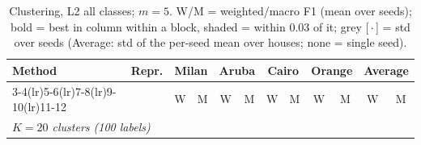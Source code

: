 \begin{table}[H]
\centering\small
\caption{Clustering, L2 all classes; $m=5$. W/M = weighted/macro F1 (mean over seeds); bold = best in column within a block, shaded = within 0.03 of it; grey [\,$\cdot$\,] = std over seeds (Average: std of the per-seed mean over houses; none = single seed).}
\label{tab:clu_l2_all_m5}
\setlength{\tabcolsep}{3.2pt}
\begin{tabular}{llcc|cc|cc|cc|cc}
\toprule
Method & Repr. & \multicolumn{2}{c}{Milan} & \multicolumn{2}{c}{Aruba} & \multicolumn{2}{c}{Cairo} & \multicolumn{2}{c}{Orange} & \multicolumn{2}{c}{Average} \\
\cmidrule(lr){3-4}\cmidrule(lr){5-6}\cmidrule(lr){7-8}\cmidrule(lr){9-10}\cmidrule(lr){11-12}
 & & W & M & W & M & W & M & W & M & W & M \\
\midrule
\multicolumn{12}{l}{\textit{$K = 20$ clusters (100 labels)}} \\
\midrule

\end{tabular}
\end{table}
